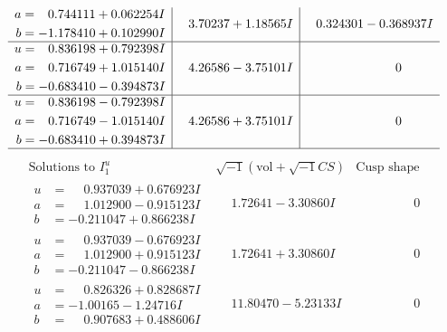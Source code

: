 \documentclass[1p]{elsarticle_modified}
\theoremstyle{definition}
\newcommand{\I}{\sqrt{-1}}
\begin{document}
$$\begin{array}{c|c|c}
\begin{aligned}
a &= \phantom{-}0.744111 + 0.062254 I \\
b &= -1.178410 + 0.102990 I\end{aligned}
 & \phantom{-}3.70237 + 1.18565 I & \phantom{-}0.324301 - 0.368937 I \\ \hline\begin{aligned}
u &= \phantom{-}0.836198 + 0.792398 I \\
a &= \phantom{-}0.716749 + 1.015140 I \\
b &= -0.683410 - 0.394873 I\end{aligned}
 & \phantom{-}4.26586 - 3.75101 I & \phantom{-0.000000 } 0 \\ \hline\begin{aligned}
u &= \phantom{-}0.836198 - 0.792398 I \\
a &= \phantom{-}0.716749 - 1.015140 I \\
b &= -0.683410 + 0.394873 I\end{aligned}
 & \phantom{-}4.26586 + 3.75101 I & \phantom{-0.000000 } 0\\
 \hline 
 \end{array}$$\newpage$$\begin{array}{c|c|c}  
\text{Solutions to }I^u_{1}& \I (\text{vol} + \sqrt{-1}CS) & \text{Cusp shape}\\
 \hline 
\begin{aligned}
u &= \phantom{-}0.937039 + 0.676923 I \\
a &= \phantom{-}1.012900 - 0.915123 I \\
b &= -0.211047 + 0.866238 I\end{aligned}
 & \phantom{-}1.72641 - 3.30860 I & \phantom{-0.000000 } 0 \\ \hline\begin{aligned}
u &= \phantom{-}0.937039 - 0.676923 I \\
a &= \phantom{-}1.012900 + 0.915123 I \\
b &= -0.211047 - 0.866238 I\end{aligned}
 & \phantom{-}1.72641 + 3.30860 I & \phantom{-0.000000 } 0 \\ \hline\begin{aligned}
u &= \phantom{-}0.826326 + 0.828687 I \\
a &= -1.00165 - 1.24716 I \\
b &= \phantom{-}0.907683 + 0.488606 I\end{aligned}
 & \phantom{-}11.80470 - 5.23133 I & \phantom{-0.000000 } 0 \\ \hline\begin{aligned}

\end{aligned}
\end{array}$$
\end{document}
